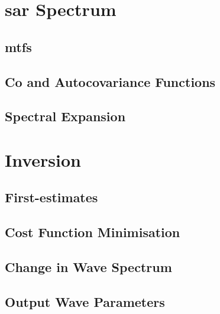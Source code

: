 \section{\acs{sar} Spectrum} \label{sec:systemDesign.sarSpectrum}

\subsection{\acf{mtf}s} \label{subsec:systemDesign.sarSpectrum.mtfs}

\subsection{Co and Autocovariance Functions} \label{subsec:systemDesign.sarSpectrum.coAutoFunc}

\subsection{Spectral Expansion} \label{subsec:systemDesign.sarSpectrum.spectralExpan}



\section{Inversion} \label{sec:systemDesign.inversion}

\subsection{First-estimates} \label{subsec:systemDesign.inversion.firstEstimates}

\subsection{Cost Function Minimisation} \label{subsec:systemDesign.inversion.costFuncMinimise}


\subsection{Change in Wave Spectrum} \label{subsec:systemDesign.inversion.changeWaveSpectrum}


\subsection{Output Wave Parameters} \label{subsec:systemDesign.inversion.outputWaveParams}



